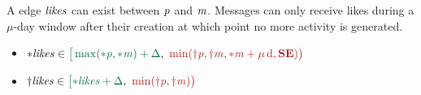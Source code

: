 A \tLikes edge $\mathit{likes}$ can exist between \tPerson $\mathit{p}$ and \tMessage $\mathit{m}$. Messages can only receive likes during a $\mu$-day window after their creation at which point no more activity is generated.

\begin{itemize}
    \item $\varc{\eLikes} \in \interval{\max(\varc{\ePerson}, \varc{\eMessage}) + \Delta}{\min (\vard{\ePerson}, \vard{\eMessage}, \varc{\eMessage} + \mu\textrm{\,d}, \xSE)}$
    \item $\vard{\eLikes} \in \interval{\varc{\eLikes} + \Delta}{\min (\vard{\ePerson}, \vard{\eMessage})}$
\end{itemize}

